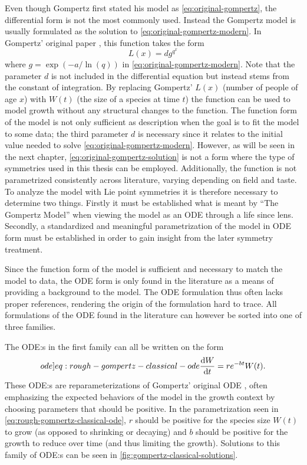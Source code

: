 Even though Gompertz first stated his model as \cref{eq:original-gompertz}, the differential form is not the most commonly used.
Instead the Gompertz model is usually formulated as the solution to \cref{eq:original-gompertz-modern}.
In Gompertz' original paper \cite{gompertz1825nature}, this function takes the form
\begin{equation} \label{eq:original-gompertz-solution}
  L(x) = d g^{q^x}
\end{equation}
where \(g = \exp(-a/\ln\left(q\right))\) in \cref{eq:original-gompertz-modern}.
Note that the parameter \(d\) is not included in the differential equation but instead stems from the constant of integration.
By replacing Gompertz' \(L(x)\) (number of people of age \(x\)) with \(W(t)\) (the size of a species at time \(t\)) the function can be used to model growth without any structural changes to the function.
The function form of the model is not only sufficient as description when the goal is to fit the model to some data; the third parameter \(d\) is necessary since it relates to the initial value needed to solve \cref{eq:original-gompertz-modern}.
However, as will be seen in the next chapter, \cref{eq:original-gompertz-solution} is not a form where the type of symmetries used in this thesis can be employed.
Additionally, the function is not parametrized consistently across literature, varying depending on field and taste.
To analyze the model with Lie point symmetries it is therefore necessary to determine two things.
Firstly it must be established what is meant by \enquote{The Gompertz Model} when viewing the model as an ODE through a life since lens.
Secondly, a standardized and meaningful parametrization of the model in ODE form must be established in order to gain insight from the later symmetry treatment.

Since the function form of the model is sufficient and necessary to match the model to data, the ODE form is only found in the literature as a means of providing a background to the model.
The ODE formulation thus often lacks proper references, rendering the origin of the formulation hard to trace.
All formulations of the ODE found in the literature can however be sorted into one of three families.

The ODE:s in the first family can all be written on the form
\begin{equation} \label[ode]{eq:rough-gompertz-classical-ode}
  \diff{W}{t} = r e^{-b t} W(t).
\end{equation}
These ODE:s are reparameterizations of Gompertz' original ODE , often emphasizing the expected behaviors of the model in the growth context by choosing parameters that should be positive.
In the parametrization seen in \cref{eq:rough-gompertz-classical-ode}, \(r\) should be positive for the species size \(W(t)\) to grow (as opposed to shrinking or decaying) and \(b\) should be positive for the growth to reduce over time (and thus limiting the growth).
Solutions to this family of ODE:s can be seen in \cref{fig:gompertz-classical-solutions}.

